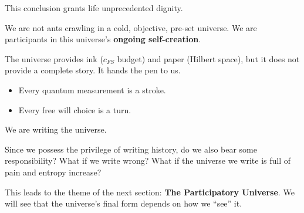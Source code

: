 This conclusion grants life unprecedented dignity.

We are not ants crawling in a cold, objective, pre-set universe. We are participants in this universe's \textbf{ongoing self-creation}.

The universe provides ink ($c_{FS}$ budget) and paper (Hilbert space), but it does not provide a complete story. It hands the pen to us.

\begin{itemize}
\item Every quantum measurement is a stroke.

\item Every free will choice is a turn.
\end{itemize}

We are writing the universe.

Since we possess the privilege of writing history, do we also bear some responsibility? What if we write wrong? What if the universe we write is full of pain and entropy increase?

This leads to the theme of the next section: \textbf{The Participatory Universe}. We will see that the universe's final form depends on how we ``see'' it.

